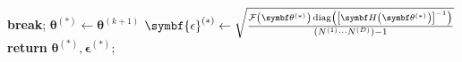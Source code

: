 \begin{algorithm}
\begin{algorithmic}[1]
                \EndIf\label{state:neg-amp-end}
                    \State \textbf{break};
                \EndIf
            \EndFor
            \State $\symbf{\theta}^{(*)} \gets \symbf{\theta}^{(k+1)}$
            \State $\symbf{\epsilon}^{(*)} \gets
                \sqrt{
                    \frac
                    {
                        \Fthstar \diag \left(
                            \left[\bdHthstar\right]^{-1}
                        \right)
                    }
                    {(\None \cdots \ND) - 1}
                }$
            \State \textbf{return} $\symbf{\theta}^{(*)}, \symbf{\epsilon}^{(*)}$;
        \EndProcedure
    \end{algorithmic}
\end{algorithm}

